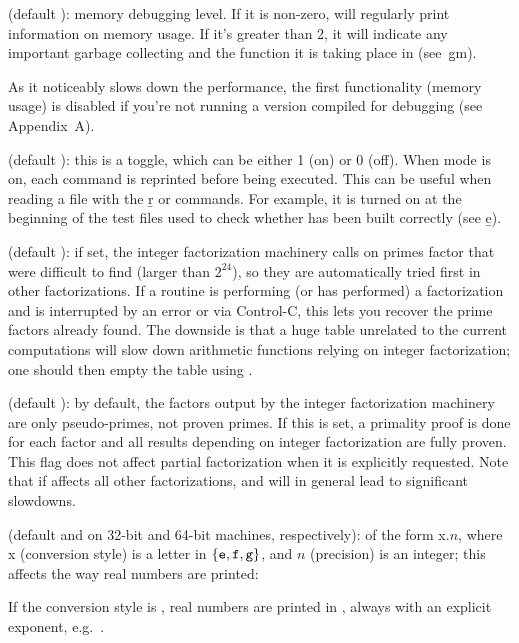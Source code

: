  (default ): memory debugging level. If it is
non-zero,  will regularly print information on memory usage. If it's
greater than 2, it will indicate any important garbage collecting and the
function it is taking place in (see~\b{gm}).

 As it noticeably slows down the performance,
the first functionality (memory usage) is disabled if you're not running a
version compiled for debugging (see Appendix~A).

 (default ): this is a toggle, which can be either 1
(on) or 0 (off). When  mode is on, each command is reprinted before
being executed. This can be useful when reading a file with the \b{r} or
 commands. For example, it is turned on at the beginning of the
test files used to check whether  has been built correctly (see
\b{e}).

 (default ): if
set, the integer factorization machinery calls  on primes
factor that were difficult to find (larger than $2^24$), so they are
automatically tried first in other factorizations. If a routine is performing
(or has performed) a factorization and is interrupted by an error or via
Control-C, this lets you recover the prime factors already found. The
downside is that a huge  table unrelated to the current
computations will slow down arithmetic functions relying on integer
factorization; one should then empty the table using .

 (default ): by
default, the factors output by the integer factorization machinery are
only pseudo-primes, not proven primes. If this is
set, a primality proof is done for each factor and all results depending on
integer factorization are fully proven. This flag does not affect partial
factorization when it is explicitly requested. Note that if affects all
other factorizations, and will in general lead to significant slowdowns.

 (default  and  on 32-bit and
64-bit machines, respectively): of the form x$.n$, where x (conversion style)
is a letter in $\{{\tt e},{\tt f},{\tt g}\}$, and $n$ (precision) is an
integer; this affects the way real numbers are printed:
\label{se:format}

\item If the conversion style is , real numbers are printed in
, always with an explicit exponent,
e.g.~.


